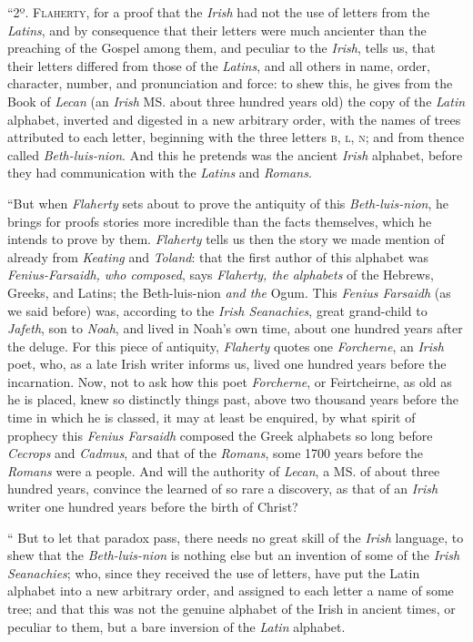 \documentclass[11pt,oneside]{memoir}
\begin{document}
``2º. \textsc{Flaherty}, for a proof that the \textit{Irish} had not the use of letters from the \textit{Latins}, and by consequence that their letters were much ancienter than the preaching of the Gospel among them, and peculiar to the \textit{Irish}, tells us, that their letters differed from those of the \textit{Latins}, and all others in name, order, character, number, and pronunciation and force:
to shew this, he gives from the Book of \textit{Lecan} (an \textit{Irish} MS. about three hundred years old) the copy of the \textit{Latin} alphabet, inverted and digested in a new arbitrary order, with the names of trees attributed to each letter, beginning with the three letters \textsc{b}, \textsc{l}, \textsc{n}; and from thence called \textit{Beth-luis-nion}.
And this he pretends was the ancient \textit{Irish} alphabet, before they had communication with the \textit{Latins} and \textit{Romans}.


``But when \textit{Flaherty} sets about to prove the antiquity of this \textit{Beth-luis-nion}, he brings for proofs stories more incredible than the facts themselves, which he intends to prove by them.
\textit{Flaherty} tells us then the story we made mention of already from \textit{Keating} and \textit{Toland}: that the first author of this alphabet was \textit{Fenius-Farsaidh, who composed}, says \textit{Flaherty, the alphabets} of the Hebrews, Greeks, and Latins; the Beth-luis-nion \textit{and the} Ogum.
This \textit{Fenius Farsaidh} (as we said before) was, according to the \textit{Irish Seanachies}, great grand-child to \textit{Jafeth}, son to \textit{Noah}, and lived in Noah's own time, about one hundred years after the deluge.
For this piece of antiquity, \textit{Flaherty} quotes one \textit{Forcherne}, an \textit{Irish} poet, who, as a late Irish writer informs us, lived one hundred years before the incarnation.
Now, not to ask how this poet \textit{Forcherne}, or Feirtcheirne, as old as he is placed, knew so distinctly things past, above two thousand years before the time in which he is classed, it may at least be enquired, by what spirit of prophecy this \textit{Fenius Farsaidh} composed the Greek alphabets so long before \textit{Cecrops} and \textit{Cadmus}, and that of the \textit{Romans}, some 1700 years before the \textit{Romans} were a people. 
And will the authority of \textit{Lecan}, a MS. of about three hundred years, convince the learned of so rare a discovery, as that of an \textit{Irish} writer one hundred years before the birth of Christ?

`` But to let that paradox pass, there needs no great skill of the \textit{Irish} language, to shew that the \textit{Beth-luis-nion} is nothing else but an invention of some of the \textit{Irish Seanachies}; who, since they received the use of letters, have put the Latin alphabet into a new arbitrary order, and assigned to each letter a name of some tree; and that this was not the genuine alphabet of the Irish in ancient times, or peculiar to them, but a bare inversion of the \textit{Latin} alphabet. 
\end{document}
